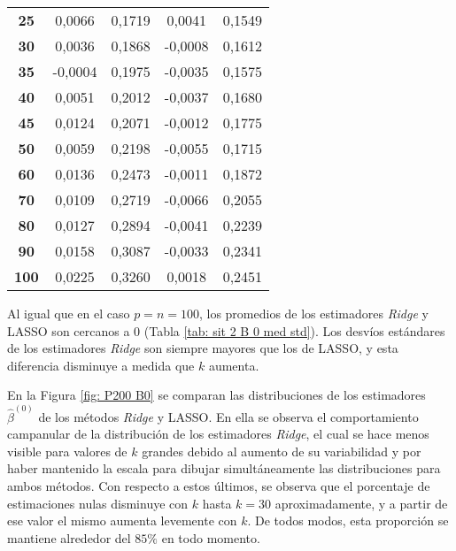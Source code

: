 \documentclass[a4paper,12pt]{report}
\begin{document}
\begin{table}[H]
\begin{tabular}{c|cc|cc}
\textbf{25} & \hspace{0.005cm} 0,0066 & 0,1719 & \hspace{0.005cm} 0,0041 & 0,1549 \\
\textbf{30} & \hspace{0.005cm} 0,0036 & 0,1868 & -0,0008 & 0,1612 \\
\textbf{35} & -0,0004 & 0,1975 & -0,0035 & 0,1575 \\
\textbf{40} & \hspace{0.005cm} 0,0051 & 0,2012 & -0,0037 & 0,1680 \\
\textbf{45} & \hspace{0.005cm} 0,0124 & 0,2071 & -0,0012 & 0,1775 \\
\textbf{50} & \hspace{0.005cm} 0,0059 & 0,2198 & -0,0055 & 0,1715 \\
\textbf{60} & \hspace{0.005cm} 0,0136 & 0,2473 & -0,0011 & 0,1872 \\
\textbf{70} & \hspace{0.005cm} 0,0109 & 0,2719 & -0,0066 & 0,2055 \\
\textbf{80} & \hspace{0.005cm} 0,0127 & 0,2894 & -0,0041 & 0,2239 \\
\textbf{90} & \hspace{0.005cm} 0,0158 & 0,3087 & -0,0033 & 0,2341 \\
\textbf{100} & \hspace{0.005cm} 0,0225 & 0,3260 & \hspace{0.005cm} 0,0018 & 0,2451
\end{tabular}
\end{table}

Al igual que en el caso $p=n=100$, los promedios de los estimadores \textit{Ridge} y LASSO son cercanos a 0 (Tabla \ref{tab: sit 2 B 0 med std}). Los desvíos estándares de los estimadores \textit{Ridge} son siempre mayores que los de LASSO, y esta diferencia disminuye a medida que $k$ aumenta.

En la Figura \ref{fig: P200 B0} se comparan las distribuciones de los estimadores $\hat{\beta}^{(0)}$ de los métodos \textit{Ridge} y LASSO. En ella se observa el comportamiento campanular de la distribución de los estimadores \textit{Ridge}, el cual se hace menos visible para valores de $k$ grandes debido al aumento de su variabilidad y por haber mantenido la escala para dibujar simultáneamente las distribuciones para ambos métodos. Con respecto a estos últimos, se observa que el porcentaje de estimaciones nulas disminuye con $k$ hasta $k=30$ aproximadamente, y a partir de ese valor el mismo aumenta levemente con $k$. De todos modos, esta proporción se mantiene alrededor del $85\%$ en todo momento.
\end{document}
